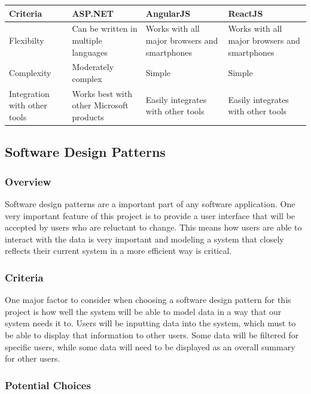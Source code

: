 \documentclass[onecolumn, draftclsnofoot,10pt, compsoc]{IEEEtran}
\begin{document}
\begin{table}[h!]
\centering
\begin{tabular}{ |p{.2\linewidth}|p{.2\linewidth}|p{.2\linewidth}|p{.2\linewidth}| } 
\hline
\textbf{Criteria} & \textbf{ASP.NET} & \textbf{AngularJS} & \textbf{ReactJS} \\ \hline
Flexibilty & Can be written in multiple languages & Works with all major browsers and smartphones & Works with all major browsers and smartphones \\ \hline
Complexity & Moderately complex & Simple & Simple\\ \hline
Integration with other tools & Works best with other Microsoft products & Easily integrates with other tools & Easily integrates with other tools \\ \hline
\end{tabular}
\end{table}

\subsection{Software Design Patterns}

\subsubsection{Overview}
Software design patterns are a important part of any software application. One very important feature of this project is to provide a user interface that will be accepted by users who are reluctant to change. This means how users are able to interact with the data is very important and modeling a system that closely reflects their current system in a more efficient way is critical.

\subsubsection{Criteria}
One major factor to consider when choosing a software design pattern for this project is how well the system will be able to model data in a way that our system needs it to. Users will be inputting data into the system, which must to be able to display that information to other users. Some data will be filtered for specific users, while some data will need to be displayed as an overall summary for other users.

\subsubsection{Potential Choices}
\end{document}
